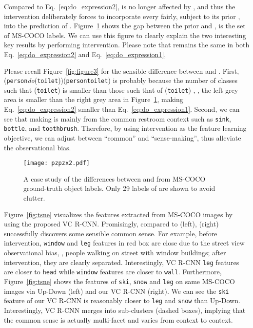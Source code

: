 \documentclass[10pt,twocolumn,letterpaper]{article}
\begin{document}
Compared to Eq.~\eqref{eq:do_expression2},  is no longer affected by , and thus the intervention deliberately forces  to incorporate every  fairly, subject to its prior , into the prediction of . Figure~\ref{fig:pzpzx} shows the gap between the prior  and ,  is the set of MS-COCO labels. We can use this figure to clearly explain the two interesting key results by performing intervention. Please note that  remains the same in both Eq.~\eqref{eq:do_expression2} and Eq.~\eqref{eq:do_expression1}, 

Please recall Figure~\ref{fig:figure3} for the sensible difference between  and . First, (\texttt{person}\textit{do}(\texttt{toilet}))(\texttt{person}\texttt{toilet}) is probably because the number of classes  such that (\texttt{toilet}) is smaller than those such that of (\texttt{toilet})  , \ie, the left grey area is smaller than the right grey area in Figure~\ref{fig:pzpzx}, making Eq.~\eqref{eq:do_expression2} smaller than Eq.~\eqref{eq:do_expression1}. Second, we can see that  making  is mainly from the common restroom context such as \texttt{sink}, \texttt{bottle}, and \texttt{toothbrush}. Therefore, by using intervention  as the feature learning objective, we can adjust between ``common'' and  ``sense-making'', thus alleviate the observational bias. 



\begin{figure}[t]
\centering
\texttt{[image: pzpzx2.pdf]}
\caption{A case study of the differences between  and  from MS-COCO ground-truth object labels. Only 29 labels of  are shown to avoid clutter.}
\label{fig:pzpzx}
\vspace{-0.06in}
\end{figure}



Figure~\ref{fig:tsne} visualizes the features extracted from MS-COCO images by using the proposed VC R-CNN. Promisingly, compared to  (left),  (right) successfully discovers some sensible common sense. For example, before intervention, \texttt{window} and \texttt{leg} features in red box are close due to the street view observational bias, \eg, people walking on street with window buildings; after intervention, they are clearly separated. Interestingly, VC R-CNN \texttt{leg} features are closer to \texttt{head} while \texttt{window} features are closer to \texttt{wall}.  
Furthermore, Figure~\ref{fig:tsne} shows the features of \texttt{ski}, \texttt{snow} and \texttt{leg} on same MS-COCO images via Up-Down (left) and our VC R-CNN (right).
We can see the \texttt{ski} feature of our VC R-CNN is reasonably closer to \texttt{leg} and \texttt{snow} than Up-Down.
Interestingly, VC R-CNN merges into sub-clusters (dashed boxes), implying that the common sense is actually multi-facet and varies from context to context.
\end{document}
